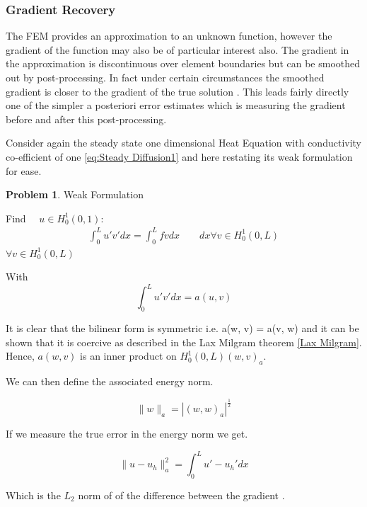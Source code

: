 \documentclass{uonmathreport}
\theoremstyle{definition}
\theoremstyle{problem}
\newtheorem{problem}{Problem}[section]
\theoremstyle{theorem}
\begin{document}
\subsubsection{Gradient Recovery} \label{subsubsec:KK}

The FEM provides an approximation to an unknown function, however the gradient of the function may also be of particular interest also. The gradient in the approximation is discontinuous over element boundaries but can be smoothed out by post-processing. In fact under certain circumstances the smoothed gradient is closer to the gradient of the true solution \cite{ainsworth65001posteriori}. This leads fairly directly one of the simpler a posteriori error estimates which is measuring the gradient before and after this post-processing.

Consider again the steady state one dimensional Heat Equation with conductivity co-efficient of one \ref{eq:Steady Diffusion1} and here restating its weak formulation for ease.

\begin{problem}{Weak Formulation}

Find $\quad u \in H^1_0(0, 1)$:
\begin{align*}
\int_0^L  u' v'  dx =   \int_0^L  f v dx  \quad \quad  dx \forall v \in H^1_0(0, L)
\end{align*}
$\forall v \in H^1_0(0, L)$
\end{problem}

With
\begin{equation*}
\int_0^L  u' v'  dx = a(u, v)  	
\end{equation*}

It is clear that the bilinear form is symmetric i.e.  a(w, v) = a(v, w) and it can be shown that it is coercive as described in the Lax Milgram theorem \ref{Lax Milgram}. Hence, $a(w, v)$ is an inner product on $H^1_0(0, L) (w, v)_a$.

We can then define the associated energy norm.

\begin{equation}
\|w\|_a = |(w, w)_a|^\frac{1}{2}
\end{equation}

If we measure the true error in the energy norm we get.

\begin{equation}
\|u-u_h\|_a^2 = \int_0^L  u' - u_h'  dx
\end{equation}

Which is the $L_2$ norm of of the difference between the gradient .
\end{document}
